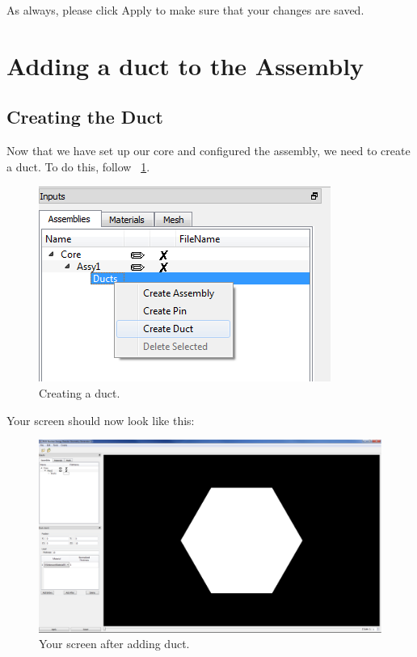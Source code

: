As always, please click Apply to make sure that your changes are saved.

\section{Adding a duct to the Assembly}

\subsection{Creating the Duct}

Now that we have set up our core and configured the assembly, we need to create a duct.  To do this, follow ~\ref{fig:Hex5}.

\begin{figure}[H]
	\begin{center}
		\includegraphics[width=0.5\linewidth]{Images/hex-5.png}
		\caption{Creating a duct.}
		\label{fig:Hex5}
	\end{center}
\end{figure}

Your screen should now look like this:

\begin{figure}[H]
	\begin{center}
		\includegraphics[width=0.85\linewidth]{Images/hex-6.png}
		\caption{Your screen after adding duct.}
		\label{fig:Hex6}
	\end{center}
\end{figure}

